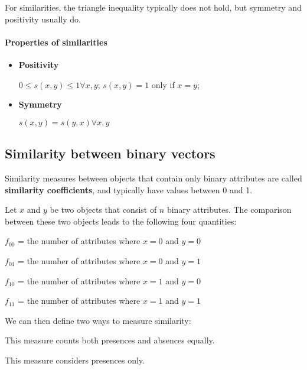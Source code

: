 For similarities, the triangle inequality typically does not hold, but symmetry and positivity usually do.

\paragraph{Properties of similarities}

\begin{itemize}
    \item \textbf{Positivity}

    $0 \leq s(x,y) \leq 1 \forall x,y$; $s(x,y) = 1$ only if $x=y$;

    \item \textbf{Symmetry}

    $s(x,y) = s(y,x) \forall x,y$
\end{itemize}

\subsection{Similarity between binary vectors}
Similarity measures between objects that contain only binary attributes are called \textbf{similarity coefficients}, and typically have values between 0 and 1.

Let $x$ and $y$ be two objects that consist of $n$ binary attributes. The comparison between these two objects leads to the following four quantities:

$f_{00}$ = the number of attributes where $x = 0$ and $y = 0$

$f_{01}$ = the number of attributes where $x = 0$ and $y = 1$

$f_{10}$ = the number of attributes where $x = 1$ and $y = 0$

$f_{11}$ = the number of attributes where $x = 1$ and $y = 1$

We can then define two ways to measure similarity:

This measure counts both presences and absences equally.

This measure considers presences only.

